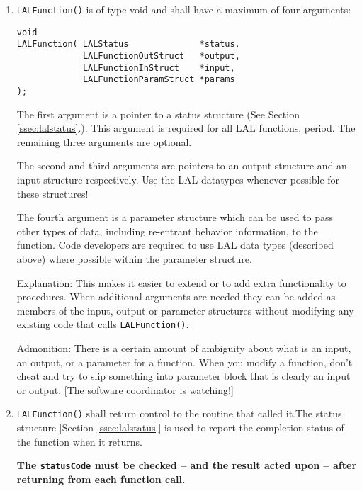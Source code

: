 \documentclass[]{ligodcc}
\begin{document}
\begin{enumerate}

\item
{\tt LALFunction()} is of type void and shall have a maximum of
four arguments:

\begin{verbatim}
void
LALFunction( LALStatus              *status,
             LALFunctionOutStruct   *output,
             LALFunctionInStruct    *input,
             LALFunctionParamStruct *params
);
\end{verbatim}

The first argument is a  pointer to a status structure (See Section
\ref{ssec:lalstatus}.). This argument is required for all LAL functions, period. The
remaining three arguments are optional.

The second and third arguments are pointers to an output structure and
an input structure respectively.  Use the LAL datatypes whenever
possible for these structures!

The fourth argument is a parameter structure which can be used to pass
other types of data, including re-entrant behavior information, to the
function. Code developers are required to use LAL data types
(described above) where possible within the parameter structure.

Explanation: This makes it easier to extend or to add extra
functionality to procedures. When additional arguments are needed they
can be added as members of the input, output or parameter structures
without modifying any existing code that calls {\tt LALFunction()}.

Admonition: There is a certain amount of ambiguity about what is an
input, an output, or a parameter for a function. When you modify a
function, don't cheat and try to slip something into parameter block
that is clearly an input or output.  [The software coordinator is
watching!]

\item
{\tt LALFunction()} shall return control to the routine that called
it.The status structure [Section \ref{ssec:lalstatus}] is used to
report the completion status of the function when it returns.

{\bf The {\tt statusCode} must be checked -- and the result acted upon
-- after returning from each function call.}


\end{enumerate}
\end{document}
